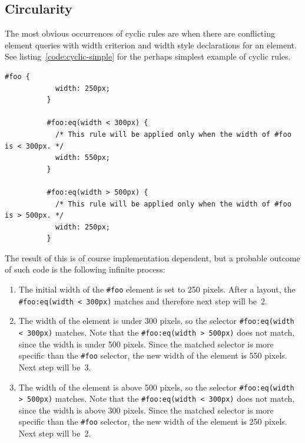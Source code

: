 \documentclass[a4paper,11pt]{kth-mag}
\newcommand{\code}[1]{\texttt{#1}}
\begin{document}
      \subsection{Circularity}\label{sec:cyclic-rules}
        The most obvious occurrences of cyclic rules are when there are conflicting element queries with width criterion and width style declarations for an \gls{element}.
        See listing~\ref{code:cyclic-simple} for the perhaps simplest example of cyclic rules.
        \begin{lstlisting}[gobble=10,caption={Simple example of cyclic rules with directly conflicting width element queries criterion and declarations. Recall the element queries psuedo syntax defined in Section~\ref{sec:eq-definitions}.}, captionpos=b, label={code:cyclic-simple}]
          #foo {
            width: 250px;
          }

          #foo:eq(width < 300px) {
            /* This rule will be applied only when the width of #foo is < 300px. */
            width: 550px;
          }

          #foo:eq(width > 500px) {
            /* This rule will be applied only when the width of #foo is > 500px. */
            width: 250px;
          }
        \end{lstlisting}
        The result of this is of course implementation dependent, but a probable outcome of such code is the following infinite process:
        \begin{enumerate}
          \item 
            The initial width of the \code{\#foo} \gls{element} is set to 250 pixels.
            After a layout, the \code{\#foo:eq(width < 300px)} matches and therefore next step will be~2.
          \item 
            The width of the \gls{element} is under 300 pixels, so the selector \code{\#foo:eq(width < 300px)} matches.
            Note that the \code{\#foo:eq(width > 500px)} does not match, since the width is under 500 pixels.
            Since the matched selector is more specific than the \code{\#foo} selector, the new width of the \gls{element} is 550 pixels.
            Next step will be~3.
          \item 
            The width of the \gls{element} is above 500 pixels, so the selector \code{\#foo:eq(width > 500px)} matches.
            Note that the \code{\#foo:eq(width < 300px)} does not match, since the width is above 300 pixels.
            Since the matched selector is more specific than the \code{\#foo} selector, the new width of the \gls{element} is 250 pixels.
            Next step will be~2.
        \end{enumerate}
\end{document}
